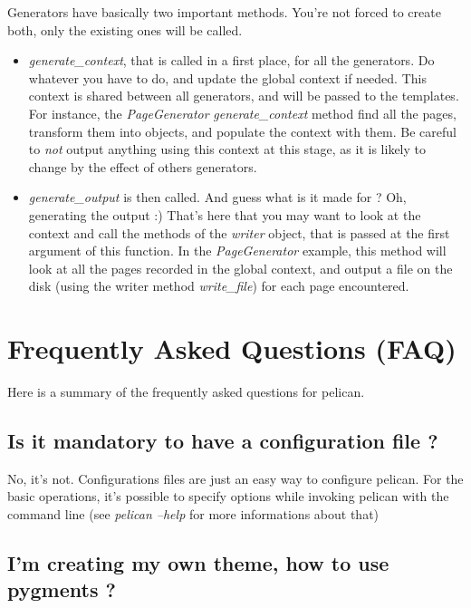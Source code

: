 \documentclass[letterpaper,10pt,english]{manual}
\begin{document}
Generators have basically two important methods. You're not forced to create
both, only the existing ones will be called.
\begin{itemize}
\item {} 
\emph{generate\_context}, that is called in a first place, for all the generators.
Do whatever you have to do, and update the global context if needed. This
context is shared between all generators, and will be passed to the
templates. For instance, the \emph{PageGenerator} \emph{generate\_context} method find
all the pages, transform them into objects, and populate the context with
them. Be careful to \emph{not} output anything using this context at this stage,
as it is likely to change by the effect of others generators.

\item {} 
\emph{generate\_output} is then called. And guess what is it made for ? Oh,
generating the output :) That's here that you may want to look at the context
and call the methods of the \emph{writer} object, that is passed at the first
argument of this function. In the \emph{PageGenerator} example, this method will
look at all the pages recorded in the global context, and output a file on
the disk (using the writer method \emph{write\_file}) for each page encountered.

\end{itemize}

\resetcurrentobjects
\hypertarget{--doc-faq}{}

\section{Frequently Asked Questions (FAQ)}

Here is a summary of the frequently asked questions for pelican.


\subsection{Is it mandatory to have a configuration file ?}

No, it's not. Configurations files are just an easy way to configure pelican.
For the basic operations, it's possible to specify options while invoking
pelican with the command line (see \emph{pelican --help} for more informations about
that)


\subsection{I'm creating my own theme, how to use pygments ?}
\end{document}
